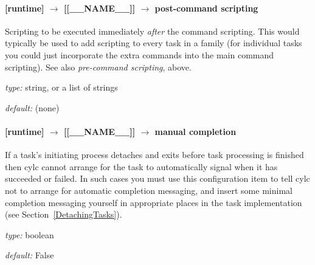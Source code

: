 \paragraph[post-command scripting]{ [runtime] $\rightarrow$ [[\_\_NAME\_\_]] $\rightarrow$ post-command scripting}

Scripting to be executed immediately {\em after} the command scripting.
This would typically be used to add scripting to every task in a family
(for individual tasks you could just incorporate the extra commands into
the main command scripting). See also {\em pre-command scripting},
above.

\begin{myitemize}
\item {\em type:} string, or a list of strings
\item {\em default:} (none)
\end{myitemize}

\paragraph[manual completion]{ [runtime] $\rightarrow$ [[\_\_NAME\_\_]] $\rightarrow$ manual completion}

If a task's initiating process detaches and exits before task processing
is finished then cylc cannot arrange for the task to automatically
signal when it has succeeded or failed. In such cases you must use this 
configuration item to tell cylc not to arrange for automatic completion
messaging, and insert some minimal completion messaging yourself in
appropriate places in the task implementation (see
Section~\ref{DetachingTasks}).

\begin{myitemize}
\item {\em type:} boolean
\item {\em default:} False
\end{myitemize}



